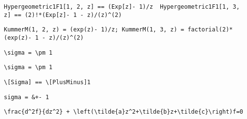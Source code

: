 \newsavebox\BKMM
\begin{lrbox}{\BKMM}
 \begin{minipage}[t]{0.82\textwidth}
  \lstinline[language={[latex]TeX},mathescape,breaklines=true]"Hypergeometric1F1[1, 2, z] == (Exp[z]- 1)/z  Hypergeometric1F1[1, 3, z] == (2)!*(Exp[z]- 1 - z)/(z)^(2)"
 \end{minipage}
\end{lrbox}
\newsavebox\BKMA
\begin{lrbox}{\BKMA}
 \begin{minipage}[t]{0.82\textwidth}
  \lstinline[language={[latex]TeX},mathescape,breaklines=true]"KummerM(1, 2, z) = (exp(z)- 1)/z; KummerM(1, 3, z) = factorial(2)*(exp(z)- 1 - z)/(z)^(2)"
 \end{minipage}
\end{lrbox}
\newsavebox\BLT
\begin{lrbox}{\BLT}
 \begin{minipage}[t]{0.82\textwidth}
  \lstinline[language={[latex]TeX},mathescape,breaklines=true]"\sigma = \pm 1"
 \end{minipage}
\end{lrbox}
\newsavebox\BLST
\begin{lrbox}{\BLST}
 \begin{minipage}[t]{0.82\textwidth}
  \lstinline[language={[latex]TeX},mathescape,breaklines=true]"\sigma = \pm 1"
 \end{minipage}
\end{lrbox}
\newsavebox\BLMM
\begin{lrbox}{\BLMM}
 \begin{minipage}[t]{0.82\textwidth}
  \lstinline[language={[latex]TeX},mathescape,breaklines=true]"\[Sigma] == \[PlusMinus]1"
 \end{minipage}
\end{lrbox}
\newsavebox\BLMA
\begin{lrbox}{\BLMA}
 \begin{minipage}[t]{0.82\textwidth}
  \lstinline[language={[latex]TeX},mathescape,breaklines=true]"sigma = &+- 1"
 \end{minipage}
\end{lrbox}
\newsavebox\BMT
\begin{lrbox}{\BMT}
 \begin{minipage}[t]{0.82\textwidth}
  \lstinline[language={[latex]TeX},mathescape,breaklines=true]"\frac{d^2f}{dz^2} + \left(\tilde{a}z^2+\tilde{b}z+\tilde{c}\right)f=0"
 \end{minipage}
\end{lrbox}
